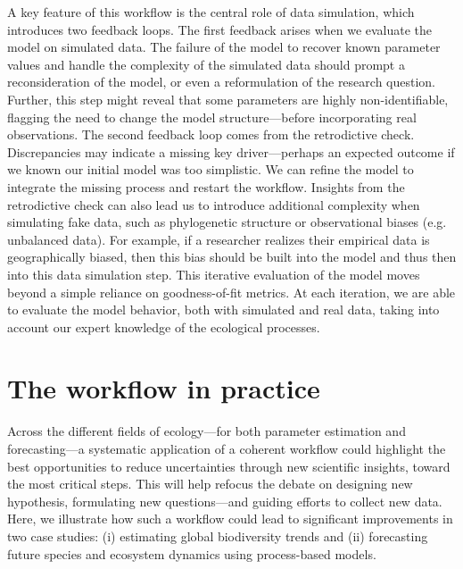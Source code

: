 \documentclass[11pt]{article}
\begin{document}
A key feature of this workflow is the central role of data simulation, which introduces two feedback loops. The first feedback arises when we evaluate the model on simulated data.
The failure of the model to recover known parameter values and handle the complexity of the simulated data should prompt a reconsideration of the model, or even a reformulation of the research question.
Further, this step might reveal that some parameters are highly non-identifiable,
flagging the need to change the model structure---before incorporating real observations. 
The second feedback loop comes from the retrodictive check. 
Discrepancies may indicate a missing key driver---perhaps an expected outcome if we known our initial model was too simplistic. We can refine the model to integrate the missing process and restart the workflow. Insights from the retrodictive check can also lead us to introduce additional complexity when simulating fake data, such as phylogenetic structure or observational biases (e.g. unbalanced data). For example, if a researcher realizes their empirical data is geographically biased, then this bias should be built into the model and thus then into this data simulation step. This iterative evaluation of the model moves beyond a simple reliance on goodness-of-fit metrics. At each iteration, we are able to evaluate the model behavior, both with simulated and real data, taking into account our expert knowledge of the ecological processes. 

\section{The workflow in practice}

Across the different fields of ecology---for both parameter estimation and forecasting---a systematic application of a coherent workflow could highlight the best opportunities to reduce uncertainties through new scientific insights, toward the most critical steps. This will help refocus the debate on designing new hypothesis, formulating new questions---and guiding efforts to collect new data. Here, we illustrate how such a workflow could lead to significant improvements in two case studies: (i) estimating global biodiversity trends and (ii) forecasting future species and ecosystem dynamics using process-based models.
\end{document}
